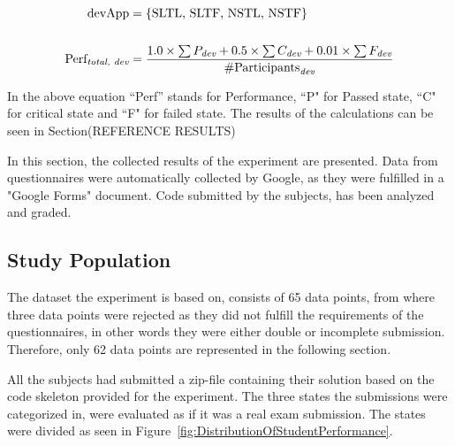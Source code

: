 \documentclass{sig-alternate-05-2015}
\begin{document}
\begin{equation} \label{eq1}
\begin{split}
\text{devApp} &= \{\text{SLTL, SLTF, NSTL, NSTF}\} \\
& \\
\text{Perf}_{\emph{total, dev}} &= \dfrac{1.0\times \sum{P_{\emph{dev}}}+0.5\times \sum {C_{\emph{dev}}}+0.01\times \sum{ F_{\emph{dev}}}}{\# \text{Participants}_{\emph{dev}}}
\end{split}
\end{equation}

In the above equation ``Perf'' stands for Performance, ``P" for Passed state, ``C" for critical state and ``F" for failed state. 
The results of the calculations can be seen in Section(REFERENCE RESULTS)

\label{sec:Results}
In this section, the collected results of the experiment are presented. Data from questionnaires were automatically collected by Google, as they were fulfilled in a "Google Forms" document. Code submitted by the subjects, has been analyzed and graded.

\subsection{Study Population}
\label{DemograpichInformation}
The dataset the experiment is based on, consists of 65 data points, from where three data points were rejected as they did not fulfill the requirements of the questionnaires, in other words they were either double or incomplete submission. Therefore, only 62 data points are represented in the following section.

All the subjects had submitted a zip-file containing their solution based on the code skeleton provided for the experiment. The three states the submissions were categorized in, were evaluated as if it was a real exam submission.
The states were divided as seen in Figure~\ref{fig:DistributionOfStudentPerformance}.
\end{document}
